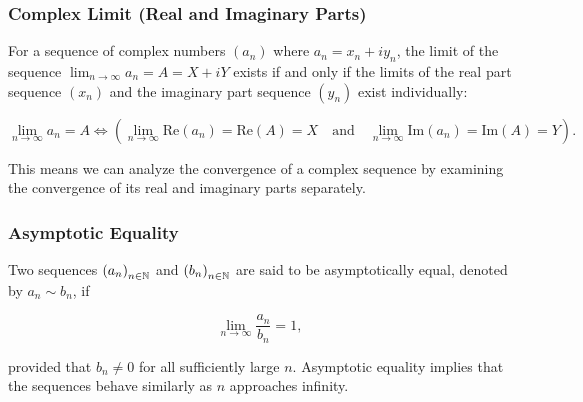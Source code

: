 \subsubsection{Complex Limit (Real and Imaginary Parts)}

For a sequence of complex numbers \((a_n)\) where \(a_n = x_n + i y_n\), the limit of the sequence 
\(\lim_{n \to \infty} a_n = A = X + i Y\) exists if and only if the limits of the real part sequence 
\((x_n)\) and the imaginary part sequence \((y_n)\) exist individually:

\[
    \lim_{n \to \infty} a_n = A \iff \left( \lim_{n \to \infty} \text{Re}(a_n) = \text{Re}(A) = X \quad \text{and} \quad \lim_{n \to \infty} \text{Im}(a_n) = \text{Im}(A) = Y \right).
\]

This means we can analyze the convergence of a complex sequence by examining the convergence of its real 
and imaginary parts separately.

\subsubsection{Asymptotic Equality}

Two sequences \({(a_n)}_{n \in \mathbb{N}}\) and \({(b_n)}_{n \in \mathbb{N}}\) are said to be 
asymptotically equal, denoted by \(a_n \sim b_n\), if

\[
    \lim_{n \to \infty} \frac{a_n}{b_n} = 1,
\]

provided that \(b_n \neq 0\) for all sufficiently large \(n\). Asymptotic equality implies that the sequences behave similarly as \(n\) approaches infinity.


